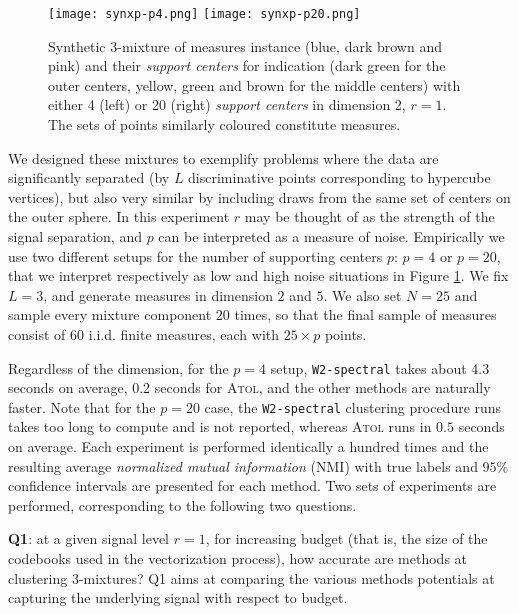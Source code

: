 \documentclass[noinfoline,preprint]{article}
\renewcommand{\1}{\mathds 1}
\begin{document}
\begin{figure}[h]
	\centering
	\texttt{[image: synxp-p4.png]}
	\texttt{[image: synxp-p20.png]}
	\caption{Synthetic 3-mixture of measures instance (blue, dark brown and pink) and their \textit{support centers} for indication (dark green for the outer centers, yellow, green and brown for the middle centers) with either 4 (left) or 20 (right) \textit{support centers} in dimension 2, $r=1$. The sets of points similarly coloured constitute measures.}
	\label{fig:setup}
\end{figure}

We designed these mixtures to exemplify problems where the data are significantly separated (by $L$ discriminative points corresponding to hypercube vertices), but also very similar by including draws from the same set of centers on the outer sphere. In this experiment $r$ may be thought of as the strength of the signal separation, and $p$ can be interpreted as a measure of noise. Empirically we use two different setups for the number of supporting centers $p$: $p=4$ or $p=20$, that we interpret respectively as low and high noise situations in Figure \ref{fig:setup}. We fix $L=3$, and generate measures in dimension $2$ and $5$. We also set $N=25$ and sample every mixture component $20$ times, so that the final sample of measures consist of $60$ i.i.d. finite measures, each with $25\times p$ points.  



Regardless of the dimension, for the $p=4$ setup, \texttt{W2-spectral} takes about 4.3 seconds on average, 0.2 seconds for \textsc{Atol}, and the other methods are naturally faster. Note that for the $p=20$ case, the \texttt{W2-spectral} clustering procedure runs takes too long to compute and is not reported, whereas \textsc{Atol} runs in $0.5$ seconds on average. Each experiment is performed identically a hundred times and the resulting average \textit{normalized mutual information} (NMI) with true labels and $95\%$ confidence intervals are presented for each method.
Two sets of experiments are performed, corresponding to the following two questions.

\textbf{Q1}: at a given signal level $r=1$, for increasing budget (that is, the size of the codebooks used in the vectorization process), how accurate are methods at clustering 3-mixtures? Q1 aims at comparing the various methods potentials at capturing the underlying signal with respect to budget.
\end{document}
